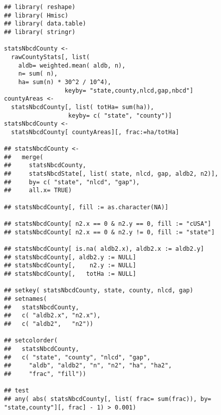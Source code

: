 \documentclass[11pt]{article}
\begin{document}
\begin{verbatim}
## library( reshape)
## library( Hmisc)
## library( data.table)
## library( stringr)

statsNbcdCounty <-
  rawCountyStats[, list(
    aldb= weighted.mean( aldb, n),
    n= sum( n),
    ha= sum(n) * 30^2 / 10^4),
                 keyby= "state,county,nlcd,gap,nbcd"]
countyAreas <-
  statsNbcdCounty[, list( totHa= sum(ha)),
                  keyby= c( "state", "county")]
statsNbcdCounty <-
  statsNbcdCounty[ countyAreas][, frac:=ha/totHa]

## statsNbcdCounty <-
##   merge(
##     statsNbcdCounty,
##     statsNbcdState[, list( state, nlcd, gap, aldb2, n2)],
##     by= c( "state", "nlcd", "gap"),
##     all.x= TRUE)

## statsNbcdCounty[, fill := as.character(NA)]

## statsNbcdCounty[ n2.x == 0 & n2.y == 0, fill := "cUSA"]
## statsNbcdCounty[ n2.x == 0 & n2.y != 0, fill := "state"]

## statsNbcdCounty[ is.na( aldb2.x), aldb2.x := aldb2.y]
## statsNbcdCounty[, aldb2.y := NULL]
## statsNbcdCounty[,    n2.y := NULL]
## statsNbcdCounty[,   totHa := NULL]

## setkey( statsNbcdCounty, state, county, nlcd, gap)
## setnames(
##   statsNbcdCounty,
##   c( "aldb2.x", "n2.x"),
##   c( "aldb2",   "n2"))

## setcolorder(
##   statsNbcdCounty,
##   c( "state", "county", "nlcd", "gap",
##     "aldb", "aldb2", "n", "n2", "ha", "ha2",
##     "frac", "fill"))

## test
## any( abs( statsNbcdCounty[, list( frac= sum(frac)), by= "state,county"][, frac] - 1) > 0.001)
\end{verbatim}
\end{document}
